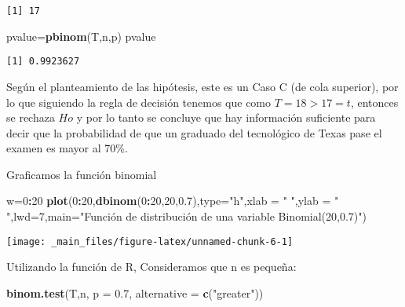 \documentclass[a4paper,oneside,openany]{book}
\newenvironment{Shaded}{\begin{snugshade}}{\end{snugshade}}
\newcommand{\KeywordTok}[1]{\textcolor[rgb]{0.13,0.29,0.53}{\textbf{#1}}}
\newcommand{\DataTypeTok}[1]{\textcolor[rgb]{0.13,0.29,0.53}{#1}}
\newcommand{\DecValTok}[1]{\textcolor[rgb]{0.00,0.00,0.81}{#1}}
\newcommand{\FloatTok}[1]{\textcolor[rgb]{0.00,0.00,0.81}{#1}}
\newcommand{\StringTok}[1]{\textcolor[rgb]{0.31,0.60,0.02}{#1}}
\newcommand{\OperatorTok}[1]{\textcolor[rgb]{0.81,0.36,0.00}{\textbf{#1}}}
\newcommand{\NormalTok}[1]{#1}
\begin{document}
\begin{verbatim}
[1] 17
\end{verbatim}

\begin{Shaded}
\begin{Highlighting}[]
\NormalTok{pvalue=}\KeywordTok{pbinom}\NormalTok{(T,n,p)}
\NormalTok{pvalue}
\end{Highlighting}
\end{Shaded}

\begin{verbatim}
[1] 0.9923627
\end{verbatim}

Según el planteamiento de las hipótesis, este es un Caso C (de cola
superior), por lo que siguiendo la regla de decisión tenemos que como
\(T=18>17=t\), entonces se rechaza \(Ho\) y por lo tanto se concluye que
hay información suficiente para decir que la probabilidad de que un
graduado del tecnológico de Texas pase el examen es mayor al 70\%.

Graficamos la función binomial

\begin{Shaded}
\begin{Highlighting}[]
\NormalTok{w=}\DecValTok{0}\OperatorTok{:}\DecValTok{20}
\KeywordTok{plot}\NormalTok{(}\DecValTok{0}\OperatorTok{:}\DecValTok{20}\NormalTok{,}\KeywordTok{dbinom}\NormalTok{(}\DecValTok{0}\OperatorTok{:}\DecValTok{20}\NormalTok{,}\DecValTok{20}\NormalTok{,}\FloatTok{0.7}\NormalTok{),}\DataTypeTok{type=}\StringTok{"h"}\NormalTok{,}\DataTypeTok{xlab =} \StringTok{" "}\NormalTok{,}\DataTypeTok{ylab =} \StringTok{" "}\NormalTok{,}\DataTypeTok{lwd=}\DecValTok{7}\NormalTok{,}\DataTypeTok{main=}\StringTok{"Función de distribución de una }
\StringTok{    variable Binomial(20,0.7)"}\NormalTok{)}
\end{Highlighting}
\end{Shaded}

\begin{center}\texttt{[image: \_main\_files/figure-latex/unnamed-chunk-6-1]} \end{center}

Utilizando la función de R, Consideramos que n es pequeña:

\begin{Shaded}
\begin{Highlighting}[]
\KeywordTok{binom.test}\NormalTok{(T,n, }\DataTypeTok{p =} \FloatTok{0.7}\NormalTok{, }\DataTypeTok{alternative =} \KeywordTok{c}\NormalTok{(}\StringTok{"greater"}\NormalTok{))}
\end{Highlighting}
\end{Shaded}
\end{document}
